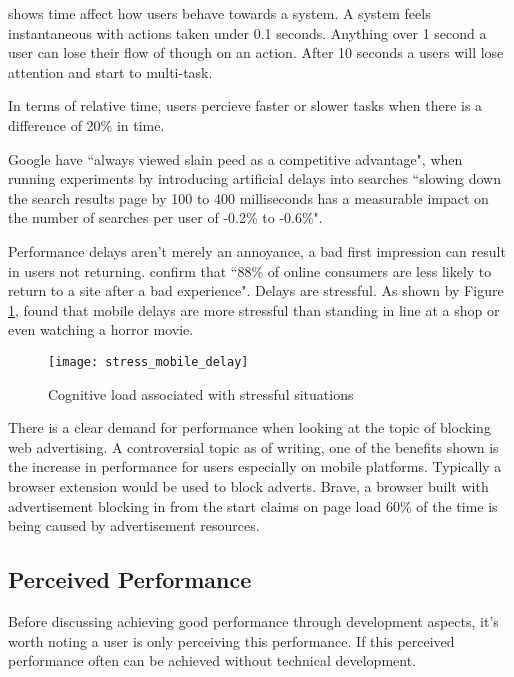 \cite{usability_engineering} shows time affect how users behave towards a system. A system feels instantaneous with actions taken under 0.1 seconds. Anything over 1 second a user can lose their flow of though on an action. After 10 seconds a users will lose attention and start to multi-task.

In terms of relative time, users percieve faster or slower tasks when there is a difference of 20\% in time. \cite{setting_a_performance_budget}

Google have ``always viewed slain peed as a competitive advantage", when running experiments by introducing artificial delays into searches ``slowing down the search results page by 100 to 400 milliseconds has a measurable impact on the number of searches per user of -0.2\% to -0.6\%". \cite{speed_matters}

Performance delays aren't merely an annoyance, a bad first impression can result in users not returning. \cite{why_web_performance_matters} confirm that ``88\% of online consumers are less likely to return to a site after a bad experience". Delays are stressful. As shown by Figure \ref{figure-stress-mobile-delay}, \cite{ericsson} found that mobile delays are more stressful than standing in line at a shop or even watching a horror movie.

\begin{figure}[H]
  \centering
    \texttt{[image: stress\_mobile\_delay]}
  \caption{Cognitive load associated with stressful situations \protect\cite{ericsson}}
  \label{figure-stress-mobile-delay}
\end{figure}

There is a clear demand for performance when looking at the topic of blocking web advertising. A controversial topic as of writing, one of the benefits shown is the increase in performance for users especially on mobile platforms. Typically a browser extension would be used to block adverts. Brave, a browser built with advertisement blocking in from the start claims on page load 60\% of the time is being caused by advertisement resources. \cite{brave}

\subsection{Perceived Performance} \label{l-r--perceived-performance}

Before discussing achieving good performance through development aspects, it's worth noting a user is only perceiving this performance. If this perceived performance often can be achieved without technical development.

